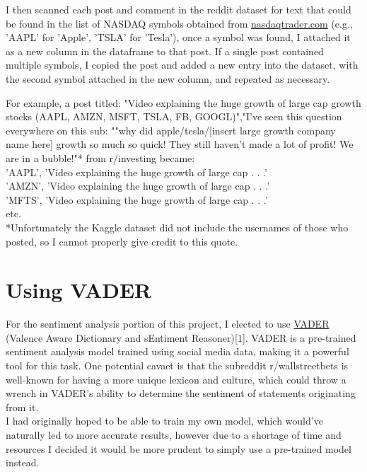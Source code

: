 \documentclass[11pt]{article}
\begin{document}
    I then scanned each post and comment in the reddit dataset for text that
    could be found in the list of NASDAQ symbols obtained from
    \href{https://www.nasdaqtrader.com/dynamic/SymDir/nasdaqtraded.txt}
    {nasdaqtrader.com} (e.g., 'AAPL' for 'Apple', 'TSLA' for 'Tesla'), once a
    symbol was found, I attached it as a new column in the dataframe to that
    post. If a single post contained multiple symbols, I copied the post and
    added a new entry into the dataset, with the second symbol attached in the
    new column, and repeated as necessary.

    For example, a post titled: "Video explaining the huge growth of large cap
    growth stocks (AAPL, AMZN, MSFT, TSLA, FB, GOOGL)","I've seen this
    question everywhere on this sub: ""why did apple/tesla/[insert large growth
    company name here] growth so much so quick! They still haven't made a lot
    of profit! We are in a bubble!"* from r/investing became:\\

    \noindent'AAPL', 'Video explaining the huge growth of large cap . . .'\\
    'AMZN', 'Video explaining the huge growth of large cap . . .'\\
    'MFTS', 'Video explaining the huge growth of large cap . . .'\\
    etc.\\

    *Unfortunately the Kaggle dataset did not include the usernames of those
    who posted, so I cannot properly give credit to this quote.
\section{Using VADER}
   For the sentiment analysis portion of this project, I elected to use
   \href{https://github.com/cjhutto/vaderSentiment}{VADER} (Valence Aware
   Dictionary and sEntiment Reasoner)[1]. VADER is a pre-trained sentiment
   analysis model trained using social media data, making it a powerful tool
   for this task. One potential cavaet is that the subreddit r/wallstreetbets
   is well-known for having a more unique lexicon and culture, which could
   throw a wrench in VADER's ability to determine the sentiment of statements
   originating from it.\\

   I had originally hoped to be able to train my own model, which would've
   naturally led to more accurate results, however due to a shortage of time
   and resources I decided it would be more prudent to simply use a
   pre-trained model instead.\\
\end{document}
